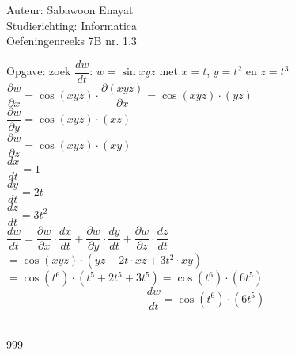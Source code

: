 \documentclass[a4paper]{article}
\begin{document}
  
\noindent \large Auteur: Sabawoon Enayat      \\
\noindent \large Studierichting: Informatica  \\
\noindent \large Oefeningenreeks 7B nr. 1.3 \\

\newcommand{\llim}{\lim\limits}

\medskip

\normalsize

Opgave: zoek $\dfrac{dw}{dt}$: $w = \sin xyz$ met $x = t$, $y = t^2$ en $z = t^3$\\

$\dfrac{\partial w}{\partial x} = \cos (xyz) \cdot \dfrac{\partial (xyz)}{\partial x} = \cos (xyz) \cdot (yz)$\\

$\dfrac{\partial w}{\partial y} = \cos (xyz) \cdot (xz)$\\

$\dfrac{\partial w}{\partial z} = \cos (xyz) \cdot (xy)$\\

$\dfrac{dx}{dt} = 1$\\

$\dfrac{dy}{dt} = 2t$\\

$\dfrac{dz}{dt} = 3t^2$\\

$\dfrac{dw}{dt} = \dfrac{\partial w}{\partial x} \cdot \dfrac{dx}{dt} + \dfrac{\partial w}{\partial y} \cdot \dfrac{dy}{dt} + \dfrac{\partial w}{\partial z} \cdot \dfrac{dz}{dt}$\\

$= \cos\left(xyz\right) \cdot \left(yz + 2t\cdot xz + 3t^2\cdot xy\right)$\\

$= \cos\left(t^6\right) \cdot \left(t^5 + 2t^5 + 3t^5\right) = \cos\left(t^6\right) \cdot \left(6t^5\right)$\\

$$\dfrac{dw}{dt} = \cos\left(t^6\right) \cdot \left(6t^5\right)$$\\

\begin{thebibliography}{999}
\end{thebibliography}
\end{document}
